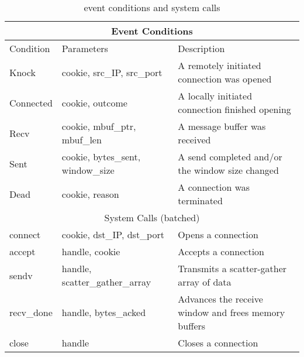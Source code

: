 \begin{table*}[t]
\centering
\begin{small}
\begin{tabular}{|l|l|l|}
\hline
\multicolumn{3}{|c|}{Event Conditions} \\
\hline
Condition &           Parameters  &                             Description\\
\hline
Knock  &               cookie, src\_IP, src\_port		& A remotely initiated connection was opened \\
Connected &            cookie, outcome				& A locally initiated connection finished opening \\
Recv &                 cookie, mbuf\_ptr, mbuf\_len		& A message buffer was received \\
Sent &                 cookie, bytes\_sent, window\_size	& A send completed and/or the window size changed \\
Dead &                 cookie, reason				& A connection was terminated \\
\hline
\hline
\multicolumn{3}{|c|}{System Calls (batched)} \\
\hline
connect &             cookie, dst\_IP, dst\_port		& Opens a connection\\
accept &              handle, cookie				& Accepts a connection\\
sendv &               handle, scatter\_gather\_array		& Transmits a scatter-gather array of data\\
recv\_done &          handle, bytes\_acked			& Advances the receive window and frees memory buffers\\
close &               handle					& Closes a connection\\
\hline
\end{tabular}
\caption{\ix event conditions and system calls}
\label{tbl:api}
\end{small}
\end{table*}

